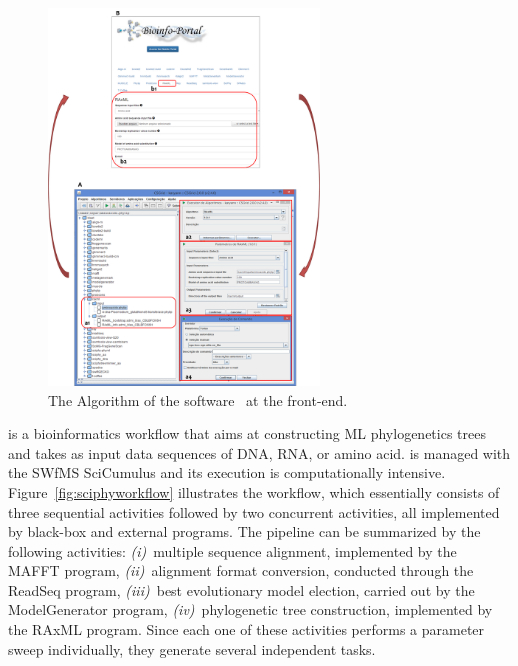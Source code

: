 \begin{figure}[!t]
\begin{center}
	\includegraphics[height=10cm]{imgs/raxmlalgorithm.png}
	\vspace{-7px}
\caption{The Algorithm of the software ~\raxml at the \system front-end.} \label{fig:raxmlalgorithm}
\end{center}
\end{figure}

\vspace{5px}
\noindent
\underline{\textbf{\sci}} is a bioinformatics workflow that aims at constructing ML phylogenetics trees and takes as input data sequences of DNA, RNA, or amino acid. \sci is managed with the SWfMS SciCumulus and its execution is computationally intensive. Figure~\ref{fig:sciphyworkflow} illustrates the \sci workflow, which essentially consists of three sequential activities followed by two concurrent activities, all implemented by black-box and external programs.
The pipeline can be summarized by the following activities:
\textit{(i)}~multiple sequence alignment, implemented by the MAFFT program, 
\textit{(ii)}~alignment format conversion, conducted through the ReadSeq program, 
\textit{(iii)}~best evolutionary model election, carried out by the ModelGenerator program, 
\textit{(iv)}~phylogenetic tree construction, implemented by the RAxML program. 
Since each one of these activities performs a parameter sweep individually, they generate several independent tasks.

